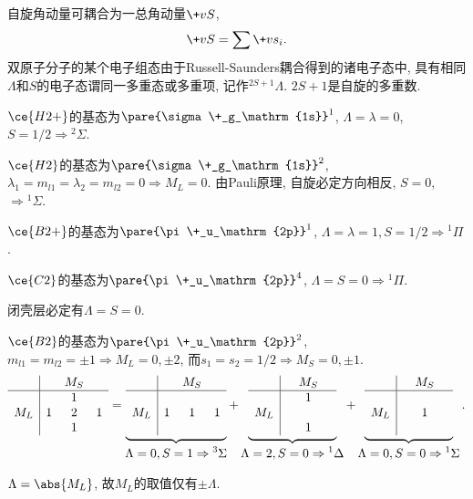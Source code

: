 \documentclass[hidelinks]{ctexart}
\begin{document}
\par
自旋角动量可耦合为一总角动量$\+vS$,
\[ \+vS = \sum \+vs_i. \]
双原子分子的某个电子组态由于Russell-Saunders耦合得到的诸电子态中, 具有相同$\Lambda$和$S$的电子态谓同一多重态或多重项, 记作$^{2S+1}\Lambda$. $2S+1$是自旋的多重数.
\begin{ex}
    $\ce{H2+}$的基态为$\pare{\sigma\+_g_\mathrm{1s}}^1$, $\Lambda = \lambda = 0$, $S = 1/2 \Rightarrow {^2\Sigma}$.
\end{ex}
\begin{ex}
    $\ce{H2}$的基态为$\pare{\sigma\+_g_\mathrm{1s}}^2$, $\lambda_1 = m_{l1} = \lambda_2 = m_{l2} = 0 \Rightarrow M_L = 0.$ 由Pauli原理, 自旋必定方向相反, $S = 0$, $\Rightarrow {^1\Sigma}$.
\end{ex}
\begin{ex}
    $\ce{B2+}$的基态为$\pare{\pi\+_u_\mathrm{2p}}^1$, $\Lambda = \lambda = 1, S = 1/2\Rightarrow {^1\Pi}$.
\end{ex}
\begin{ex}
    $\ce{C2}$的基态为$\pare{\pi\+_u_\mathrm{2p}}^4$, $\Lambda = S = 0 \Rightarrow  {^1\Pi}$.
\end{ex}
闭壳层必定有$\Lambda = S = 0$.
\begin{ex}
    $\ce{B2}$的基态为$\pare{\pi\+_u_\mathrm{2p}}^2$, $m_{l1} = m_{l2} = \pm 1 \Rightarrow M_L = 0, \pm 2$, 而$s_1 = s_2 = 1/2 \Rightarrow M_S = 0, \pm 1$.
    \[ \begin{array}{c|ccc}
    &   & M_S & \\
    \hline
    &   & 1   & \\
M_L & 1 & 2   & 1\\
    &   & 1   & 
\end{array} = \underbrace{\begin{array}{c|ccc}
    &   & M_S & \\
    \hline
    &   &     & \\
M_L & 1 & 1   & 1\\
    &   &     & 
\end{array}}_{\displaystyle \Lambda = 0, S = 1\Rightarrow {^3\Sigma}} + 
\underbrace{\begin{array}{c|ccc}
    &   & M_S & \\
    \hline
    &   & 1   & \\
M_L &   &     & \\
    &   & 1   & 
\end{array}}_{\displaystyle \Lambda = 2, S = 0\Rightarrow {^1\Delta}} + 
\underbrace{\begin{array}{c|ccc}
    &   & M_S & \\
    \hline
    &   &     & \\
M_L &   & 1   & \\
    &   &     & 
\end{array}}_{\displaystyle \Lambda = 0, S = 0\Rightarrow {^1\Sigma}}. \]
\end{ex}
\begin{pitfall}
    $\Lambda = \abs{M_L}$, 故$M_L$的取值仅有$\pm \Lambda$.
\end{pitfall}
\end{document}
